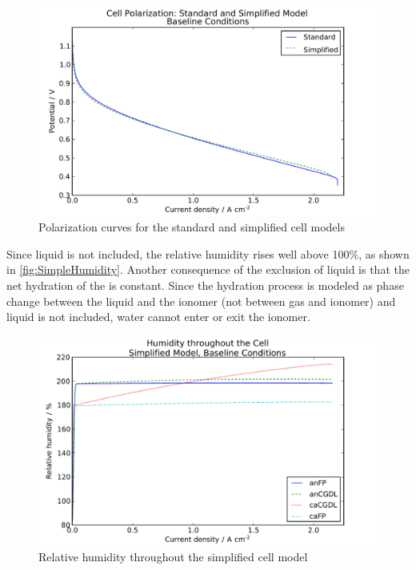 \begin{figure}[htbp]
  \includegraphics[width=\linewidth]{Results/Cell/Model/Simple/Polarization}%
  \caption{Polarization curves for the standard and simplified cell models}%
  \label{fig:SimplePolarization}
\end{figure}

Since liquid is not included, the relative humidity rises well above 100\%, as shown in \autoref{fig:SimpleHumidity}.  Another consequence of the exclusion of liquid is that the net hydration of the  is constant.  Since the hydration process is modeled as phase change between the liquid and the ionomer (not between gas and ionomer) and liquid is not included, water cannot enter or exit the ionomer.  

\begin{figure}[htbp]
  \includegraphics[width=\linewidth]{Results/Cell/Model/Simple/Humidity}%
  \caption{Relative humidity throughout the simplified cell model}%
  \label{fig:SimpleHumidity}
\end{figure}


